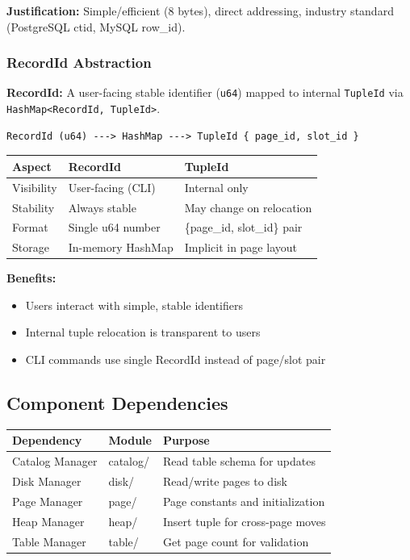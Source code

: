 \documentclass[11pt,a4paper]{article}
\begin{document}
\textbf{Justification:} Simple/efficient (8 bytes), direct addressing, industry standard (PostgreSQL ctid, MySQL row\_id).

\subsubsection{RecordId Abstraction}

\textbf{RecordId:} A user-facing stable identifier (\texttt{u64}) mapped to internal \texttt{TupleId} via \texttt{HashMap<RecordId, TupleId>}.

\begin{lstlisting}
RecordId (u64) ---> HashMap ---> TupleId { page_id, slot_id }
\end{lstlisting}

\begin{table}[H]
\centering
\begin{tabular}{@{}lll@{}}
\toprule
\textbf{Aspect} & \textbf{RecordId} & \textbf{TupleId} \\
\midrule
Visibility & User-facing (CLI) & Internal only \\
Stability & Always stable & May change on relocation \\
Format & Single u64 number & \{page\_id, slot\_id\} pair \\
Storage & In-memory HashMap & Implicit in page layout \\
\bottomrule
\end{tabular}
\end{table}

\textbf{Benefits:}
\begin{itemize}
    \item Users interact with simple, stable identifiers
    \item Internal tuple relocation is transparent to users
    \item CLI commands use single RecordId instead of page/slot pair
\end{itemize}

\subsection{Component Dependencies}

\begin{table}[H]
\centering
\begin{tabular}{@{}lll@{}}
\toprule
\textbf{Dependency} & \textbf{Module} & \textbf{Purpose} \\
\midrule
Catalog Manager & catalog/ & Read table schema for updates \\
Disk Manager & disk/ & Read/write pages to disk \\
Page Manager & page/ & Page constants and initialization \\
Heap Manager & heap/ & Insert tuple for cross-page moves \\
Table Manager & table/ & Get page count for validation \\
\bottomrule
\end{tabular}
\end{table}
\end{document}

